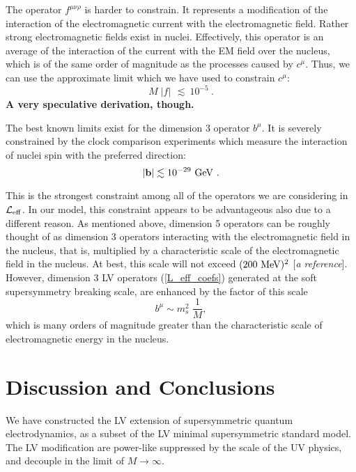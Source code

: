 \documentclass[12pt]{revtex4}
\begin{document}
The operator $ f^{\mu\nu\rho} $ 
is harder to constrain.
It represents a modification of the interaction of 
the electromagnetic current with the electromagnetic field.
Rather strong electromagnetic fields exist in nuclei.
Effectively, this operator is an average of the interaction
of the current with the EM field over the nucleus, which is
of the same order of magnitude as the processes caused 
by $ c^\mu $.
Thus, we can use the approximate limit which we have used to
constrain $ c^\mu $:
\begin{equation}
M\; | f |\, ~\lesssim~ 10^{-5}~.
\end{equation}
{\bf A very speculative derivation, though.}

The best known limits exist for the dimension 3 operator
$ b^\mu $.
It is severely constrained by the clock comparison experiments which
measure the interaction of nuclei spin with the preferred
direction:
\begin{equation}
| {\mathbf b} | \lesssim 10^{-29}~{\rm GeV}
        ~.
\end{equation}

This is the strongest constraint among all of the operators
we are considering in $ \mathcal{L}_{\rm eff} $.
In our model, this constraint appears to be advantageous
also due to a different reason.
As mentioned above, dimension 5 operators can be roughly
thought of as dimension 3 operators interacting with the
electromagnetic field in the nucleus, that is,
multiplied by a characteristic scale of the electromagnetic
field in the nucleus.
At best, this scale will not exceed $ (200\ {\rm MeV})^2 $
[{\it a reference}].
However, dimension 3 LV operators (\ref{L_eff_coefs}) 
generated at the soft
supersymmetry breaking scale, are enhanced by the factor
of this scale
\[
b^\mu \sim m_s^2\; \frac{1}{M},
\]
which is many orders of magnitude greater than the characteristic
scale of electromagnetic energy in the nucleus.






\section{Discussion and Conclusions}

We have constructed the LV extension of supersymmetric quantum electrodynamics,
as a subset of the LV minimal supersymmetric standard model.
The LV modification are power-like suppressed by the scale of the UV physics,
and decouple in the limit of $M\to \infty$. 
\end{document}
